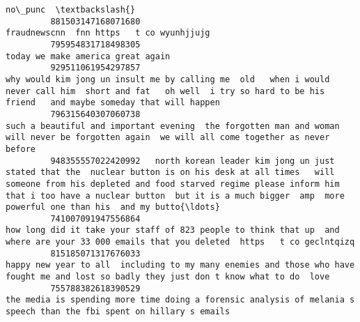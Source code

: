 \documentclass[11pt]{article}
\begin{document}
\begin{Verbatim}[commandchars=\\\{\}]
                                                                                                                                                                                                                                                                                                              no\_punc  \textbackslash{}
         881503147168071680                                                                                                                                                                                                                                                 fraudnewscnn  fnn https   t co wyunhjjujg   
         795954831718498305                                                                                                                                                                                                                                                        today we make america great again    
         929511061954297857                                                                                                           why would kim jong un insult me by calling me  old   when i would never call him  short and fat   oh well  i try so hard to be his friend   and maybe someday that will happen    
         796315640307060738                                                                                                                                              such a beautiful and important evening  the forgotten man and woman will never be forgotten again  we will all come together as never before   
         948355557022420992   north korean leader kim jong un just stated that the  nuclear button is on his desk at all times   will someone from his depleted and food starved regime please inform him that i too have a nuclear button  but it is a much bigger  amp  more powerful one than his  and my butto{\ldots}   
         741007091947556864                                                                                                                                                how long did it take your staff of 823 people to think that up  and where are your 33 000 emails that you deleted  https   t co geclntqizq   
         815185071317676033                                                                                                                                                 happy new year to all  including to my many enemies and those who have fought me and lost so badly they just don t know what to do  love    
         755788382618390529                                                                                                                                                                     the media is spending more time doing a forensic analysis of melania s speech than the fbi spent on hillary s emails    

\end{Verbatim}
\end{document}
